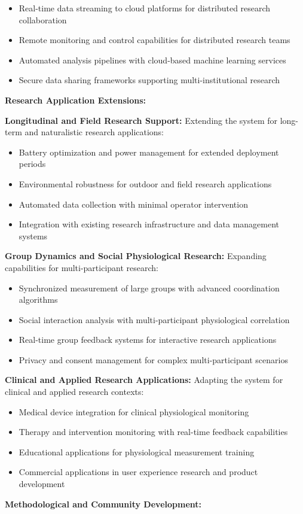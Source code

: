 \documentclass[12pt,a4paper]{report}
\begin{document}
\begin{itemize}
\item Real-time data streaming to cloud platforms for distributed research collaboration
\item Remote monitoring and control capabilities for distributed research teams
\item Automated analysis pipelines with cloud-based machine learning services
\item Secure data sharing frameworks supporting multi-institutional research

\end{itemize}
\textbf{Research Application Extensions:}

\textbf{Longitudinal and Field Research Support:}
Extending the system for long-term and naturalistic research applications:

\begin{itemize}
\item Battery optimization and power management for extended deployment periods
\item Environmental robustness for outdoor and field research applications
\item Automated data collection with minimal operator intervention
\item Integration with existing research infrastructure and data management systems

\end{itemize}
\textbf{Group Dynamics and Social Physiological Research:}
Expanding capabilities for multi-participant research:

\begin{itemize}
\item Synchronized measurement of large groups with advanced coordination algorithms
\item Social interaction analysis with multi-participant physiological correlation
\item Real-time group feedback systems for interactive research applications
\item Privacy and consent management for complex multi-participant scenarios

\end{itemize}
\textbf{Clinical and Applied Research Applications:}
Adapting the system for clinical and applied research contexts:

\begin{itemize}
\item Medical device integration for clinical physiological monitoring
\item Therapy and intervention monitoring with real-time feedback capabilities
\item Educational applications for physiological measurement training
\item Commercial applications in user experience research and product development

\end{itemize}
\textbf{Methodological and Community Development:}
\end{document}
